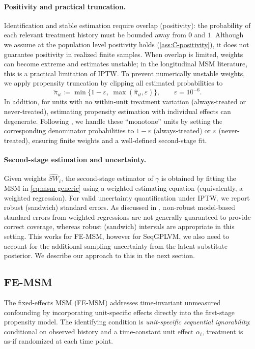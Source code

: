\paragraph{Positivity and practical truncation.}
Identification and stable estimation require overlap (positivity): 
the probability of each relevant treatment history must be bounded away from $0$ and $1$. 
Although we assume at the population level positivity holds (\ref{ass:C-positivity}), 
it does not guarantee positivity in realized finite samples.
When overlap is limited, weights can become extreme and estimates unstable; 
in the longitudinal MSM literature, this is a practical limitation of IPTW. 
To prevent numerically unstable weights, we apply propensity truncation by clipping all estimated probabilities to
\[
\widetilde{\pi}_{it} := \min\{1-\varepsilon,\;\max(\widehat{\pi}_{it},\varepsilon)\},\qquad \varepsilon=10^{-6}.
\]
In addition, for units with no within-unit treatment variation 
(always-treated or never-treated), estimating propensity estimation with individual effects can degenerate. 
Following \cite{blackwellEffectPoliticalAdvertising2024}, we handle these ``monotone'' 
units by setting the corresponding denominator probabilities to $1-\varepsilon$ 
(always-treated) or $\varepsilon$ (never-treated), ensuring finite weights and a 
well-defined second-stage fit. 

\paragraph{Second-stage estimation and uncertainty.}
Given weights $\widehat{SW}_i$, the second-stage estimator of $\gamma$ is 
obtained by fitting the MSM in
\eqref{eq:msm-generic} using a weighted estimating equation 
(equivalently, a weighted regression).
For valid uncertainty quantification under IPTW, we report robust (sandwich)
standard errors. As discussed in \cite{robinsMarginalStructuralModels2000},
non-robust model-based standard errors from weighted regressions are not generally
guaranteed to provide correct coverage, whereas robust (sandwich) intervals are
appropriate in this setting. This works for FE-MSM, however for SeqGPLVM, 
we also need to account for the additional sampling uncertainty from the latent substitute 
posterior. We describe our approach to this 
in the next section.

\subsection{FE-MSM}
The fixed-effects MSM (FE-MSM) addresses time-invariant unmeasured confounding by incorporating unit-specific effects directly into the first-stage propensity model. The identifying condition is \emph{unit-specific sequential ignorability}: conditional on observed history and a time-constant unit effect $\alpha_i$, treatment is as-if randomized at each time point.

